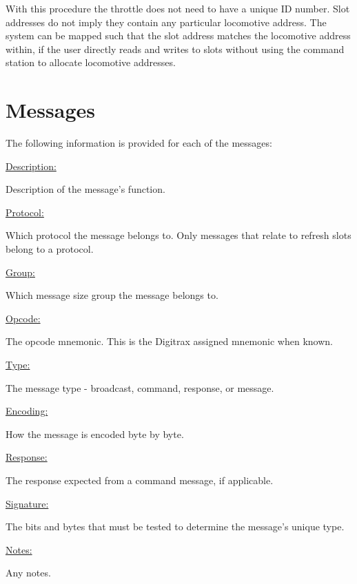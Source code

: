 With this procedure the throttle does not need to have a unique ID number. Slot addresses do not imply they contain any particular locomotive address. The system can be mapped such that the slot address matches the locomotive address within, if the user directly reads and writes to slots without using the command station to allocate locomotive addresses.

\section{Messages}

The following information is provided for each of the messages:

\underline{Description:}

Description of the message's function.

\underline{Protocol:}

Which protocol the message belongs to. Only messages that relate to refresh slots belong to a protocol.

\underline{Group:}

Which message size group the message belongs to.

\underline{Opcode:}

The opcode mnemonic. This is the Digitrax assigned mnemonic when known.

\underline{Type:}

The message type - broadcast, command, response, or message.

\underline{Encoding:} 

How the message is encoded byte by byte.

\underline{Response:} 

The response expected from a command message, if applicable.

\underline{Signature:}

The bits and bytes that must be tested to determine the message's unique type.

\underline{Notes:} 

Any notes.

